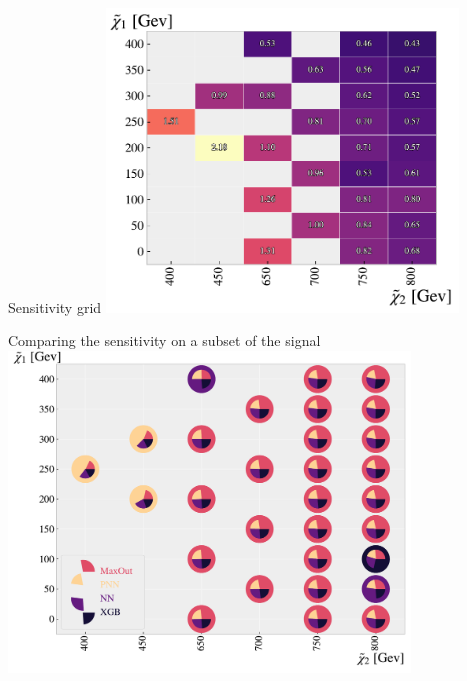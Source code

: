 \documentclass[UKenglish]{beamer}
\begin{document}
\begin{frame}{Sensitivity grid}
    \centering
    \includegraphics[width=0.7\textwidth]{figures/grids/XGBGridSig.pdf}    
\end{frame}

\begin{frame}{Comparing the sensitivity on a subset of the signal}
    \centering
    \includegraphics[width=0.8\textwidth]{figures/Comps/GenPlussXGBNetworkComp.pdf}
\end{frame}
\end{document}
